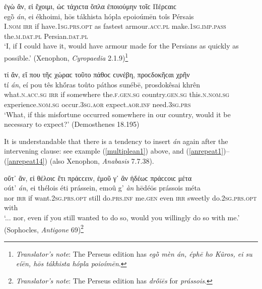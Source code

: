 \begin{exe}
\ex ἐγὼ ἄν, εἰ ἔχοιμι, ὡϲ τάχιϲτα ὅπλα ἐποιούμην τοῖϲ Πέρϲαιϲ\\
\gll egṑ \emph{án}, ei ékhoimi, hōs tákhista hópla epoioúmēn toîs Pérsais\\
I.\textsc{nom} \textsc{irr} if have.\textsc{1sg.prs.opt} as fastest armour.\textsc{acc.pl} make.\textsc{1sg.imp.pass} the.\textsc{m.dat.pl} Persian.\textsc{dat.pl}\\
\trans `I, if I could have it, would have armour made for the Persians as quickly as possible.' (Xenophon, \textit{Cyropaedia} 2.1.9)\footnote{\emph{Translator's note}: The Perseus edition has \textit{egṑ mèn án, éphē ho Kûros, ei su eíēn, hōs tákhista hópla poioímēn}.}
\label{clausean9}
\end{exe}

\begin{exe}
\ex τί ἄν, εἴ που τῆϲ χώραϲ τοῦτο πάθοϲ ϲυνέβη, προϲδοκῆϲαι χρῆν\\
\gll tí \emph{án}, eí pou tês khṓras toûto páthos sunébē, prosdokêsai khrên\\
what.\textsc{n.acc.sg} \textsc{irr} if somewhere the.\textsc{f.gen.sg} country.\textsc{gen.sg} this.\textsc{n.nom.sg} experience.\textsc{nom.sg} occur.\textsc{3sg.aor} expect.\textsc{aor.inf} need.\textsc{3sg.prs}\\
\trans `What, if this misfortune occurred somewhere in our country, would it be necessary to expect?' (Demosthenes 18.195)
\label{clausean10}
\end{exe}

It is understandable that there is a tendency to insert \emph{án} again after the intervening clause: see example (\ref{multiplean1}) above, and (\ref{anrepeat1})--(\ref{anrepeat14}) (also Xenophon, \textit{Anabasis} 7.7.38).

\begin{exe}
\ex οὔτ᾽ ἄν, εἰ θέλοιϲ ἔτι πράϲϲειν, ἐμοῦ γ᾽ ἂν ἡδέωϲ πράϲϲοιϲ μέτα\\
\gll oút' \emph{án}, ei thélois éti prássein, emoû g' \emph{àn} hēdéōs prássois méta\\
nor \textsc{irr} if want.\textsc{2sg.prs.opt} still do.\textsc{prs.inf} me.\textsc{gen} even \textsc{irr} sweetly do.\textsc{2sg.prs.opt} with\\
\trans `... nor, even if you still wanted to do so, would you willingly do so with me.' (Sophocles, \textit{Antigone} 69)\footnote{\emph{Translator's note}: The Perseus edition has \textit{drṓiēs} for \textit{prássois}.}
\label{anrepeat1}
\end{exe}

